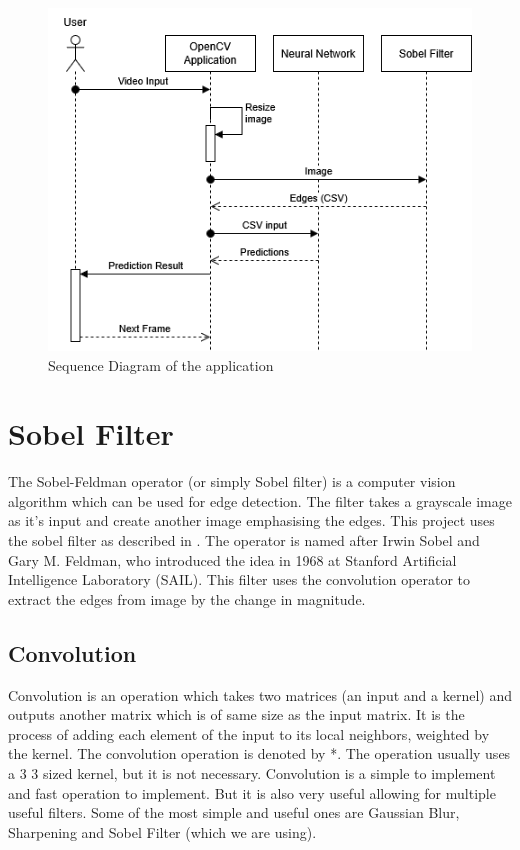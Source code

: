 \documentclass[a4paper,oneside,12pt]{report}
\begin{document}
\begin{figure}[htbp]
\centering
\includegraphics[width=.9\linewidth]{Introduction/2025-04-22_00-41-01_sequence_diagram.drawio.png}
\caption{\label{fig:org1e06527}Sequence Diagram of the application}
\end{figure}

\chapter{Sobel Filter}
\label{sec:org636f6fe}
The Sobel-Feldman operator (or simply Sobel filter) is a computer vision algorithm which can be used for edge detection. The filter takes a grayscale image as it's input and create another image emphasising the edges. This project uses the sobel filter as described in \citep{sobelop}. The operator is named after Irwin Sobel and Gary M. Feldman, who introduced the idea in 1968 at Stanford Artificial Intelligence Laboratory (SAIL). This filter uses the convolution operator to extract the edges from image by the change in magnitude.

\section{Convolution}
\label{sec:org5bcbe64}
Convolution is an operation which takes two matrices (an input and a kernel) and outputs another matrix which is of same size as the input matrix. It is the process of adding each element of the input to its local neighbors, weighted by the kernel. The convolution operation is denoted by *​. The operation usually uses a 3 \texttimes{} 3 sized kernel, but it is not necessary. Convolution is a simple to implement and fast operation to implement. But it is also very useful allowing for multiple useful filters. Some of the most simple and useful ones are Gaussian Blur, Sharpening and Sobel Filter (which we are using).
\end{document}
